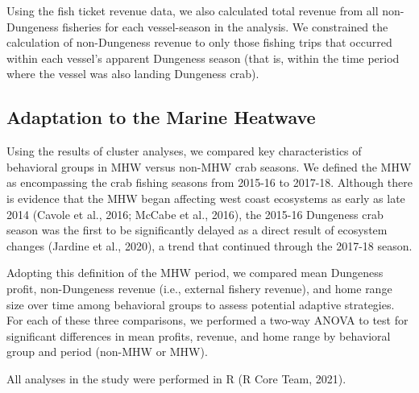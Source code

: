 \documentclass[]{elsarticle} %
\begin{document}
Using the fish ticket revenue data, we also calculated total revenue
from all non-Dungeness fisheries for each vessel-season in the analysis.
We constrained the calculation of non-Dungeness revenue to only those
fishing trips that occurred within each vessel's apparent Dungeness
season (that is, within the time period where the vessel was also
landing Dungeness crab).

\hypertarget{adaptation-to-the-marine-heatwave}{%
\subsection{Adaptation to the Marine
Heatwave}\label{adaptation-to-the-marine-heatwave}}

Using the results of cluster analyses, we compared key characteristics
of behavioral groups in MHW versus non-MHW crab seasons. We defined the
MHW as encompassing the crab fishing seasons from 2015-16 to 2017-18.
Although there is evidence that the MHW began affecting west coast
ecosystems as early as late 2014 (Cavole et al., 2016; McCabe et al.,
2016), the 2015-16 Dungeness crab season was the first to be
significantly delayed as a direct result of ecosystem changes (Jardine
et al., 2020), a trend that continued through the 2017-18 season.

Adopting this definition of the MHW period, we compared mean Dungeness
profit, non-Dungeness revenue (i.e., external fishery revenue), and home
range size over time among behavioral groups to assess potential
adaptive strategies. For each of these three comparisons, we performed a
two-way ANOVA to test for significant differences in mean profits,
revenue, and home range by behavioral group and period (non-MHW or MHW).

All analyses in the study were performed in R (R Core Team, 2021).
\end{document}
